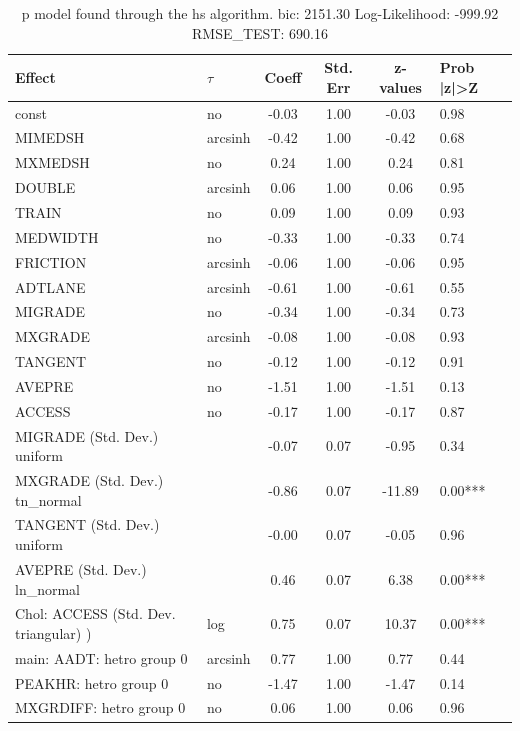 \begin{table}
	\caption{p model found through the hs algorithm. bic: 2151.30 Log-Likelihood: -999.92 RMSE_TEST: 690.16}
	\begin{center}
		\begin{tabular}{|l|l|c|c|c|l|}
			\hline
			Effect & $\tau$ & Coeff & Std. Err & z-values & Prob |z|>Z \\
			\hline
			const & no & -0.03 & 1.00 & -0.03 & 0.98 \\
			\hline
			MIMEDSH & arcsinh & -0.42 & 1.00 & -0.42 & 0.68 \\
			\hline
			MXMEDSH & no & 0.24 & 1.00 & 0.24 & 0.81 \\
			\hline
			DOUBLE & arcsinh & 0.06 & 1.00 & 0.06 & 0.95 \\
			\hline
			TRAIN & no & 0.09 & 1.00 & 0.09 & 0.93 \\
			\hline
			MEDWIDTH & no & -0.33 & 1.00 & -0.33 & 0.74 \\
			\hline
			FRICTION & arcsinh & -0.06 & 1.00 & -0.06 & 0.95 \\
			\hline
			ADTLANE & arcsinh & -0.61 & 1.00 & -0.61 & 0.55 \\
			\hline
			MIGRADE & no & -0.34 & 1.00 & -0.34 & 0.73 \\
			\hline
			MXGRADE & arcsinh & -0.08 & 1.00 & -0.08 & 0.93 \\
			\hline
			TANGENT & no & -0.12 & 1.00 & -0.12 & 0.91 \\
			\hline
			AVEPRE & no & -1.51 & 1.00 & -1.51 & 0.13 \\
			\hline
			ACCESS & no & -0.17 & 1.00 & -0.17 & 0.87 \\
			\hline
			MIGRADE (Std. Dev.) uniform &  & -0.07 & 0.07 & -0.95 & 0.34 \\
			\hline
			MXGRADE (Std. Dev.) tn_normal &  & -0.86 & 0.07 & -11.89 & 0.00*** \\
			\hline
			TANGENT (Std. Dev.) uniform &  & -0.00 & 0.07 & -0.05 & 0.96 \\
			\hline
			AVEPRE (Std. Dev.) ln_normal &  & 0.46 & 0.07 & 6.38 & 0.00*** \\
			\hline
			 Chol: ACCESS (Std. Dev. triangular) ) & log & 0.75 & 0.07 & 10.37 & 0.00*** \\
			\hline
			main: AADT: hetro group 0 & arcsinh & 0.77 & 1.00 & 0.77 & 0.44 \\
			\hline
			PEAKHR: hetro group 0 & no & -1.47 & 1.00 & -1.47 & 0.14 \\
			\hline
			MXGRDIFF: hetro group 0 & no & 0.06 & 1.00 & 0.06 & 0.96 \\

\end{tabular}
\end{center}
\end{table}
